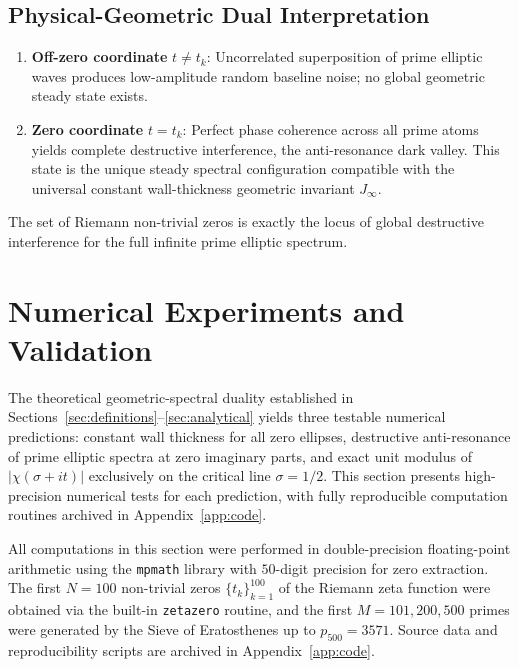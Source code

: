 \documentclass[10pt,reqno]{article}
\newcommand{\Jinf}{J_\infty}
\begin{document}
\subsection{Physical-Geometric Dual Interpretation}
\label{subsec:interpretation}

\begin{enumerate}
\item \textbf{Off-zero coordinate} $t\neq t_k$: Uncorrelated superposition of prime elliptic waves produces low-amplitude random baseline noise; no global geometric steady state exists.
\item \textbf{Zero coordinate} $t=t_k$: Perfect phase coherence across all prime atoms yields complete destructive interference, the anti-resonance dark valley. This state is the unique steady spectral configuration compatible with the universal constant wall-thickness geometric invariant $\Jinf$.
\end{enumerate}
The set of Riemann non-trivial zeros is exactly the locus of global destructive interference for the full infinite prime elliptic spectrum.

\section{Numerical Experiments and Validation}
\label{sec:numerical}

The theoretical geometric-spectral duality established in Sections~\ref{sec:definitions}--\ref{sec:analytical} yields three testable numerical predictions: constant wall thickness for all zero ellipses, destructive anti-resonance of prime elliptic spectra at zero imaginary parts, and exact unit modulus of $|\chi(\sigma+it)|$ exclusively on the critical line $\sigma=1/2$. This section presents high-precision numerical tests for each prediction, with fully reproducible computation routines archived in Appendix~\ref{app:code}.

All computations in this section were performed in double-precision floating-point arithmetic using the \texttt{mpmath} library with $50$-digit precision for zero extraction. The first $N=100$ non-trivial zeros $\{t_k\}_{k=1}^{100}$ of the Riemann zeta function were obtained via the built-in \texttt{zetazero} routine, and the first $M=101,200,500$ primes were generated by the Sieve of Eratosthenes up to $p_{500}=3571$. Source data and reproducibility scripts are archived in Appendix~\ref{app:code}.
\end{document}
